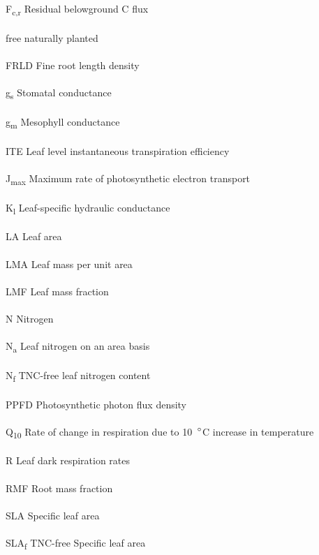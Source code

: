 \documentclass[a4paper]{article}\usepackage[]{graphicx}\usepackage[]{color}
\begin{document}
\\
\\
F\textsubscript{c,r}  Residual belowground C flux
\\
\\
free  naturally planted
\\
\\
FRLD Fine root length density
\\
\\
g\textsubscript{s}  Stomatal conductance
\\
\\
g\textsubscript{m}  Mesophyll conductance
\\
\\
ITE Leaf level instantaneous transpiration efficiency
\\
\\
J\textsubscript{max} Maximum rate of photosynthetic electron transport 
\\
\\
K\textsubscript{l} Leaf-specific hydraulic conductance 
\\
\\
LA Leaf area
\\
\\
LMA Leaf mass per unit area
\\
\\
LMF Leaf mass fraction
\\
\\
N  Nitrogen
\\
\\
N\textsubscript{a} Leaf nitrogen on an area basis
\\
\\
N\textsubscript{f} TNC-free leaf nitrogen content
\\
\\
PPFD  Photosynthetic photon flux density
\\
\\
Q\textsubscript{10} Rate of change in respiration due to 10~$\degree$C increase in temperature
\\
\\
R Leaf dark respiration rates
\\
\\
RMF Root mass fraction
\\
\\
SLA Specific leaf area
\\
\\
SLA\textsubscript{f}  TNC-free Specific leaf area
\\
\\
\end{document}
